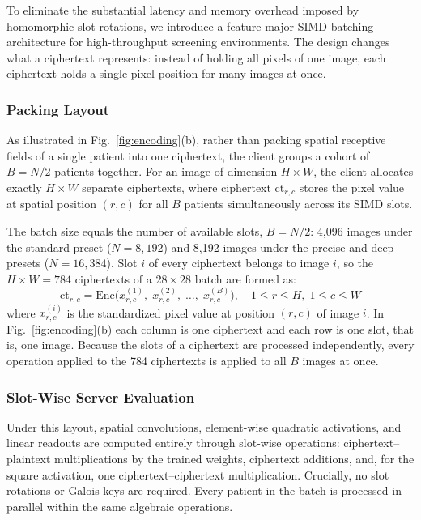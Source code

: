 \documentclass[conference]{IEEEtran}
\begin{document}
To eliminate the substantial latency and memory overhead imposed by homomorphic slot rotations, we introduce a feature-major SIMD batching architecture for high-throughput screening environments. The design changes what a ciphertext represents: instead of holding all pixels of one image, each ciphertext holds a single pixel position for many images at once.

\subsubsection{Packing Layout}
As illustrated in Fig.~\ref{fig:encoding}(b), rather than packing spatial receptive fields of a single patient into one ciphertext, the client groups a cohort of $B = N/2$ patients together. For an image of dimension $H \times W$, the client allocates exactly $H \times W$ separate ciphertexts, where ciphertext $\mathrm{ct}_{r,c}$ stores the pixel value at spatial position $(r, c)$ for all $B$ patients simultaneously across its SIMD slots.

The batch size equals the number of available slots, $B = N/2$: 4,096 images under the standard preset ($N = 8{,}192$) and 8,192 images under the precise and deep presets ($N = 16{,}384$). Slot $i$ of every ciphertext belongs to image $i$, so the $H \times W = 784$ ciphertexts of a $28 \times 28$ batch are formed as:
\begin{equation}
\mathrm{ct}_{r,c} = \mathrm{Enc}\bigl(x^{(1)}_{r,c},\; x^{(2)}_{r,c},\; \ldots,\; x^{(B)}_{r,c}\bigr), \quad 1 \leq r \leq H,\; 1 \leq c \leq W
\label{eq:simd_pack}
\end{equation}
where $x^{(i)}_{r,c}$ is the standardized pixel value at position $(r, c)$ of image $i$. In Fig.~\ref{fig:encoding}(b) each column is one ciphertext and each row is one slot, that is, one image. Because the slots of a ciphertext are processed independently, every operation applied to the 784 ciphertexts is applied to all $B$ images at once.

\subsubsection{Slot-Wise Server Evaluation}
Under this layout, spatial convolutions, element-wise quadratic activations, and linear readouts are computed entirely through slot-wise operations: ciphertext--plaintext multiplications by the trained weights, ciphertext additions, and, for the square activation, one ciphertext--ciphertext multiplication. Crucially, no slot rotations or Galois keys are required. Every patient in the batch is processed in parallel within the same algebraic operations.
\end{document}
